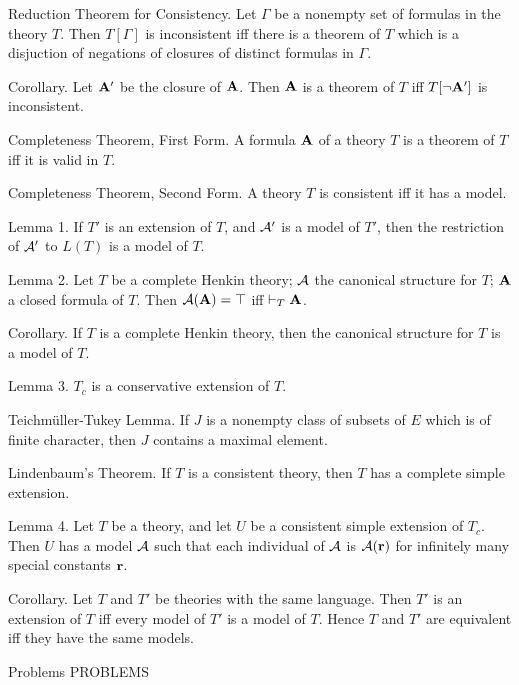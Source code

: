 \proclaim Reduction Theorem for Consistency. Let $\Gamma$ be a nonempty set of
formulas in the theory $T$. Then $T[\Gamma]$ is inconsistent iff there is a theorem
of $T$ which is a disjuction of negations of closures of distinct formulas in $\Gamma$.

\proclaim Corollary. Let ${\bf A}'$ be the closure of ${\bf A}$. Then ${\bf A}$ is a theorem of $T$
iff $T[\neg {\bf A}']$ is inconsistent.


\proclaim Completeness Theorem, First Form. A formula ${\bf A}$ of a theory $T$ is a theorem
of $T$ iff it is valid in $T$.

\proclaim Completeness Theorem, Second Form. A theory $T$ is consistent iff it has a model.

\proclaim Lemma 1. If $T'$ is an extension of $T$, and ${\cal A}'$ is a model of $T'$,
then the restriction of ${\cal A}'$ to $L(T)$ is a model of $T$.

\proclaim Lemma 2. Let $T$ be a complete Henkin theory; ${\cal A}$ the canonical
structure for $T$; ${\bf A}$ a closed formula of $T$. Then ${\cal A}({\bf A}) = \top$ iff
$\vdash_T {\bf A}$.

\proclaim Corollary. If $T$ is a complete Henkin theory, then the canonical
structure for $T$ is a model of $T$.

\proclaim Lemma 3. $T_c$ is a conservative extension of $T$.

\proclaim Teichm\"uller-Tukey Lemma. If $J$ is a nonempty class of subsets of $E$ which is
of finite character, then $J$ contains a maximal element.

\proclaim Lindenbaum's Theorem. If $T$ is a consistent theory, then $T$ has a complete
simple extension.

\proclaim Lemma 4. Let $T$ be a theory, and let $U$ be a consistent simple extension of
$T_c$. Then $U$ has a model ${\cal A}$ such that each individual of ${\cal A}$ is ${\cal A}({\bf r})$ for
infinitely many special constants ${\bf r}$.

\proclaim Corollary. Let $T$ and $T'$ be theories with the same language. Then $T'$ is an
extension of $T$ iff every model of $T'$ is a model of $T$. Hence $T$ and $T'$ are
equivalent iff they have the same models.

 {Problems}
\beginsection PROBLEMS

\vfill
\break
